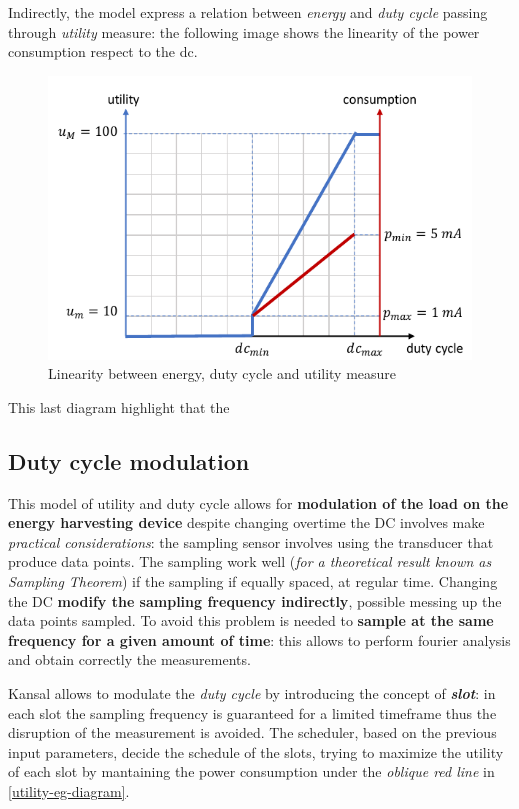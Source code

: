 \documentclass[10pt,a4paper]{report}
\theoremstyle{definition}
\begin{document}
Indirectly, the model express a relation between \textit{energy} and \textit{duty cycle} passing through \textit{utility} measure: the following image shows the linearity of the power consumption respect to the dc.


\begin{figure}[h]
	\centering\includegraphics[scale=0.50]{images/Pasted image 20230509162726.png}
	\caption{Linearity between energy, duty cycle and utility measure}
	\label{energy-consumption-dc}
\end{figure}
This last diagram highlight that the 

\subsection{Duty cycle modulation}\label{sec:duty-cycle-modulation}
This model of utility and duty cycle allows for \textbf{modulation of the load on the energy harvesting device} despite changing overtime the DC involves make \textit{practical considerations}: the sampling sensor involves using the transducer that produce data points. The sampling work well (\textit{for a theoretical result known as Sampling Theorem}) if the sampling if equally spaced, at regular time.
Changing the DC \textbf{modify the sampling frequency indirectly}, possible messing up the data points sampled.
To avoid this problem is needed to \textbf{sample at the same frequency for a given amount of time}: this allows to perform fourier analysis and obtain correctly the measurements.

Kansal allows to modulate the \textit{duty cycle} by introducing the concept of \textit{\textbf{slot}}: in each slot the sampling frequency is guaranteed for a limited timeframe thus the disruption of the measurement is avoided.
The scheduler, based on the previous input parameters, decide the schedule of the slots, trying to maximize the utility of each slot by mantaining the power consumption under the \textit{oblique red line} in \ref{utility-eg-diagram}. 
\end{document}
